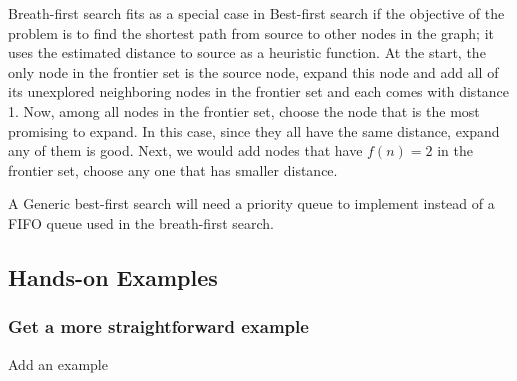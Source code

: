 \documentclass[../main.tex]{subfiles}
\begin{document}
 Breath-first search fits as  a special case in Best-first search if the objective of the problem is to find the shortest path from source to other nodes in the graph; it uses the estimated distance to source as a heuristic function.  At the start, the only node in the frontier set is the source node, expand this node and add all of its unexplored neighboring nodes in the frontier set and each comes with distance 1. Now, among all nodes in the frontier set, choose the node that is the most promising to expand. In this case, since they all have the same distance, expand any of them is good. Next, we would add nodes that have $f(n)=2$ in the frontier set, choose any one that has smaller distance. 
 
 A Generic best-first search will need a priority queue to implement instead of a FIFO queue used in the breath-first search. 


 
 
 \subsection{Hands-on Examples}
 
 \subsubsection{Get a more straightforward example} Add an example





    
\end{document}
